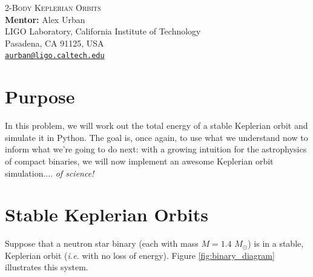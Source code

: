 \documentclass[11pt]{article}
\begin{document}
\begin{center}
{\Large\textsc{2-Body Keplerian Orbits}} \\
\vspace{10pt}
{\large \textbf{Mentor:} Alex Urban} \\
{\small LIGO Laboratory, California Institute of Technology \\
Pasadena, CA 91125, USA \\
\href{mailto:aurban@ligo.caltech.edu}{\texttt{aurban@ligo.caltech.edu}}}
\end{center}


\section*{Purpose}

\hspace{15pt} In this problem, we will work out the total energy of a stable Keplerian orbit and simulate it in Python. The goal is, once again, to use what we understand now to inform what we're going to do next: with a growing intuition for the astrophysics of compact binaries, we will now implement an awesome Keplerian orbit simulation.... \textit{of science!}

\section*{Stable Keplerian Orbits}
\hspace{15pt} Suppose that a neutron star binary (each with mass $M = 1.4\,\, M_{\odot}$) is in a stable, Keplerian orbit (\textit{i.e.} with no loss of energy). Figure \ref{fig:binary_diagram} illustrates this system.

\vspace{20pt}
\end{document}
